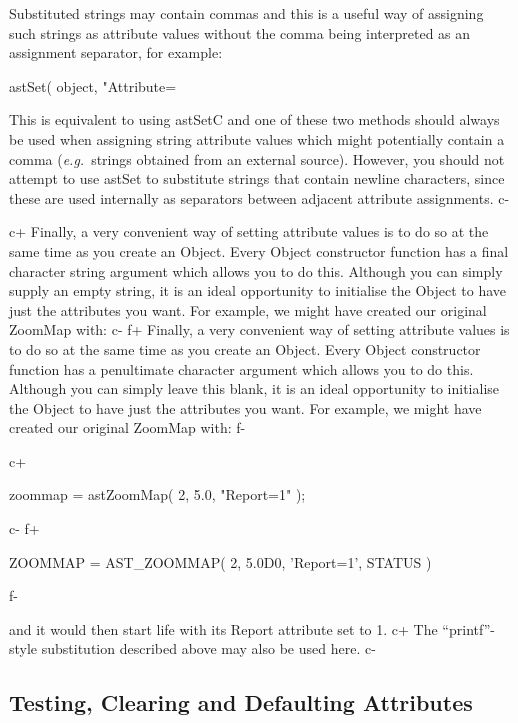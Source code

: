 \documentclass[twoside,11pt]{starlink}
\begin{document}
Substituted strings may contain commas and this is a useful way of
assigning such strings as attribute values without the comma being
interpreted as an assignment separator, for example:

\small
\begin{terminalv}
astSet( object, "Attribute=%
\end{terminalv}
\normalsize

This is equivalent to using astSetC and one of these two methods
should always be used when assigning string attribute values which
might potentially contain a comma (\emph{e.g.}\ strings obtained from
an external source). However, you should not attempt to use astSet to
substitute strings that contain newline characters, since these are
used internally as separators between adjacent attribute assignments.
c-
\label{ss:attributeinitialisation}

c+
Finally, a very convenient way of setting attribute values is to do so
at the same time as you create an Object. Every Object constructor
function has a final character string argument which allows you to do
this. Although you can simply supply an empty string, it is an ideal
opportunity to initialise the Object to have just the attributes you
want. For example, we might have created our original ZoomMap with:
c-
f+
Finally, a very convenient way of setting attribute values is to do so
at the same time as you create an Object. Every Object constructor
function has a penultimate character argument which allows you to do
this. Although you can simply leave this blank, it is an ideal
opportunity to initialise the Object to have just the attributes you
want. For example, we might have created our original ZoomMap with:
f-

c+
\small
\begin{terminalv}
zoommap = astZoomMap( 2, 5.0, "Report=1" );
\end{terminalv}
\normalsize
c-
f+
\small
\begin{terminalv}
      ZOOMMAP = AST_ZOOMMAP( 2, 5.0D0, 'Report=1', STATUS )
\end{terminalv}
\normalsize
f-

and it would then start life with its Report attribute set to 1.
c+
The ``printf''-style substitution described above may also be used
here.
c-

\subsection{\label{ss:defaultingattributes}Testing, Clearing and Defaulting Attributes}
\end{document}
